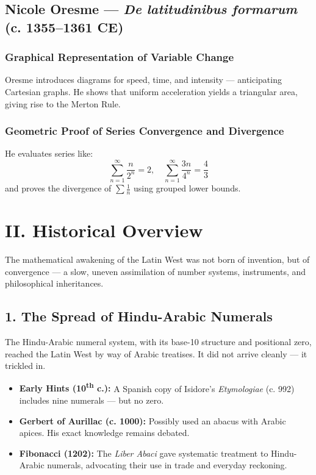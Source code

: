 \documentclass[9pt]{article}
\begin{document}
\subsection*{Nicole Oresme — \textit{De latitudinibus formarum} (c. 1355–1361 CE)}

\subsubsection*{Graphical Representation of Variable Change}

Oresme introduces diagrams for speed, time, and intensity — anticipating Cartesian graphs.  
He shows that uniform acceleration yields a triangular area, giving rise to the Merton Rule.

\subsubsection*{Geometric Proof of Series Convergence and Divergence}

He evaluates series like:
\[
\sum_{n=1}^\infty \frac{n}{2^n} = 2, \quad \sum_{n=1}^\infty \frac{3n}{4^n} = \frac{4}{3}
\]
and proves the divergence of \( \sum \frac{1}{n} \) using grouped lower bounds.



\newpage

\section*{II. Historical Overview}

The mathematical awakening of the Latin West was not born of invention, but of convergence —  
a slow, uneven assimilation of number systems, instruments, and philosophical inheritances.

\subsection*{1. The Spread of Hindu-Arabic Numerals}

The Hindu-Arabic numeral system, with its base-10 structure and positional zero, reached the Latin West by way of Arabic treatises.  
It did not arrive cleanly — it trickled in.

\begin{itemize}
    \item \textbf{Early Hints (10\textsuperscript{th} c.):} A Spanish copy of Isidore’s \textit{Etymologiae} (c. 992) includes nine numerals — but no zero.
    \item \textbf{Gerbert of Aurillac (c. 1000):} Possibly used an abacus with Arabic apices. His exact knowledge remains debated.
    \item \textbf{Fibonacci (1202):} The \textit{Liber Abaci} gave systematic treatment to Hindu-Arabic numerals, advocating their use in trade and everyday reckoning.
\end{itemize}
\end{document}
